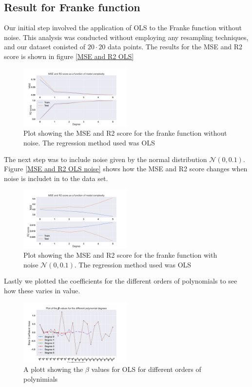 \thispagestyle{plain}
\subsection{Result for Franke function}
\noindent Our initial step involved the application of OLS to the Franke function without noise.	
This analysis was conducted without employing any resampling techniques, 
and our dataset conisted of $20 \cdot 20$ data points. The results for the MSE and R2 score is shown in 
figure \eqref{MSE and R2 OLS}

\begin{figure}[H]
	\centering
	\includegraphics[width=0.5\textwidth]{Figure_3.png}
	\caption{Plot showing the MSE and R2 score for the franke function without noise. The regression method used was OLS}
	\label{MSE and R2 OLS}
\end{figure}
\noindent The next step was to include noise given by the normal distribution $\mathcal{N}(0,0.1)$. Figure \eqref{MSE and R2 OLS noise} shows
how the MSE and R2 score changes when noise is includet in to the data set.
\begin{figure}[H]
	\centering
	\includegraphics[width=0.5\textwidth]{Figure_4.png}
	\caption{Plot showing the MSE and R2 score for the franke function with noise $\mathcal{N}(0,0.1)$. The regression method used was OLS}
	\label{MSE and R2 OLS noise}
\end{figure}
Lastly we plotted the coefficients for the different orders of polynomials to see how these varies in value.
\begin{figure}[H]
	\centering
	\includegraphics[width=0.5\textwidth]{Figure_12.png}
	\caption{A plott showing the $\beta$ values for OLS for different orders of polynimials}
	\label{beta OLS}
\end{figure}



